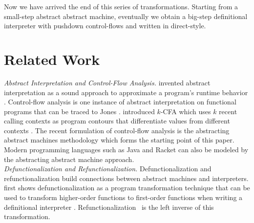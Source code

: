 \documentclass[acmsmall, review]{acmart}\settopmatter{}
\begin{document}
Now we have arrived the end of this series of transformations. Starting from a
small-step abstract abstract machine, eventually we obtain a big-step definitional
interpreter with pushdown control-flows and written in direct-style.


\section{Related Work}\label{sec:related}

\textit{Abstract Interpretation and Control-Flow Analysis.}
\citeauthor{cousot1977abstract} invented abstract interpretation as a sound approach to
approximate a program's runtime behavior \cite{cousot1977abstract}. Control-flow analysis
is one instance of abstract interpretation on functional programs that can be traced to
Jones \cite{jones1981flow}. \citeauthor{Shivers:1988:CFA:53990.54007} introduced $k$-CFA
which uses $k$ recent calling contexts as program contours that differentiate values from
different contexts \cite{Shivers:1988:CFA:53990.54007, Shivers:1991:SSC:115865.115884}.
The recent formulation of control-flow analysis is the abstracting abstract machines
methodology \cite{van2012systematic, van2010abstracting} which forms the starting point
of this paper. Modern programming languages such as Java \cite{might2010resolving} and
Racket \cite{Tobin-Hochstadt:2012:HSE:2384616.2384655} can also be modeled by the abstracting
abstract machine approach. \\

\textit{Defunctionalization and Refunctionalization.}
Defunctionalization and refunctionalization build connections between abstract machines and
interpreters. \citeauthor{Reynolds:72} first shows defunctionalization as a program transformation 
technique that can be used to transform higher-order functions to first-order functions when
writing a definitional interpreter \cite{Reynolds:72, Reynolds:HOSC98-revisited}.
Refunctionalization~\cite{TODOrefunc} is the left inverse of this transformation.
\end{document}
